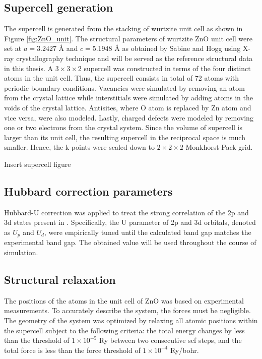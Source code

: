     \subsection{Supercell generation}
    The supercell is generated from the stacking of wurtzite  unit cell as  shown in Figure \ref{fig:ZnO_unit}. The structural parameters of wurtzite ZnO unit cell were set at $a=3.2427 $ {\AA} and $c = 5.1948 $ {\AA} as obtained by Sabine and Hogg \citep{Sabine1969}  using X-ray crystallography technique and will be served as the reference structural data in this thesis. A $3 \times 3 \times 2$ supercell was constructed  in terms of the four distinct atoms in the unit cell. Thus, the supercell consists in total of 72 atoms with periodic boundary conditions. Vacancies were simulated by removing an atom from the crystal lattice while interstitials were simulated by adding atoms in the voids of the crystal lattice. Antisites, where O atom is replaced by Zn atom and vice versa, were also modeled. Lastly, charged defects were modeled by removing one or two electrons from the crystal system. Since the volume of supercell is larger than its unit cell, the resulting supercell in the reciprocal space is much smaller. Hence, the k-points were scaled down to $2 \times 2 \times 2$ Monkhorst-Pack grid.  

    Insert supercell figure

    \subsection{Hubbard correction parameters}
    Hubbard-U correction was applied to treat the strong correlation of the 2p and 3d states present in . Specifically, the U parameter of 2p and 3d orbitals, denoted as $U_{p}$ and $U_{d}$, were empirically tuned until the calculated band gap matches the experimental band gap. The obtained value will be used throughout the course of simulation.  

    \subsection{Structural relaxation}
    The positions of the atoms in the unit cell of ZnO was based on experimental measurements.  To accurately describe the system, the forces must be negligible. The geometry of the system was optimized by relaxing all atomic positions within the supercell subject to the following criteria: the total energy changes by less than the threshold of $1 \times 10^{-5}$ Ry between two consecutive scf steps, and the total force is less than the force threshold of $1 \times 10^{-4}$ Ry/bohr. 

